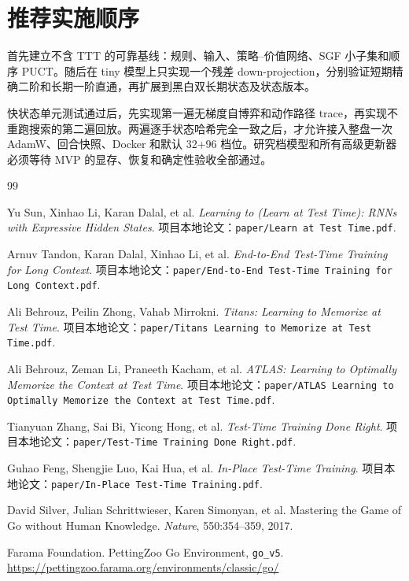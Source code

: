 \documentclass[UTF8,11pt,a4paper]{ctexart}
\newcommand{\code}[1]{\texttt{#1}}
\begin{document}
\section{推荐实施顺序}

首先建立不含 TTT 的可靠基线：规则、输入、策略--价值网络、SGF 小子集和顺序 PUCT。随后在 tiny 模型上只实现一个残差 down-projection，分别验证短期精确二阶和长期一阶直通，再扩展到黑白双长期状态及状态版本。

快状态单元测试通过后，先实现第一遍无梯度自博弈和动作路径 trace，再实现不重跑搜索的第二遍回放。两遍逐手状态哈希完全一致之后，才允许接入整盘一次 AdamW、回合快照、Docker 和默认 32+96 档位。研究档模型和所有高级更新器必须等待 MVP 的显存、恢复和确定性验收全部通过。

\begin{thebibliography}{99}
\small

Yu Sun, Xinhao Li, Karan Dalal, et al.
\newblock \emph{Learning to (Learn at Test Time): RNNs with Expressive Hidden States}.
\newblock 项目本地论文：\code{paper/Learn at Test Time.pdf}.

Arnuv Tandon, Karan Dalal, Xinhao Li, et al.
\newblock \emph{End-to-End Test-Time Training for Long Context}.
\newblock 项目本地论文：\code{paper/End-to-End Test-Time Training for Long Context.pdf}.

Ali Behrouz, Peilin Zhong, Vahab Mirrokni.
\newblock \emph{Titans: Learning to Memorize at Test Time}.
\newblock 项目本地论文：\code{paper/Titans Learning to Memorize at Test Time.pdf}.

Ali Behrouz, Zeman Li, Praneeth Kacham, et al.
\newblock \emph{ATLAS: Learning to Optimally Memorize the Context at Test Time}.
\newblock 项目本地论文：\code{paper/ATLAS Learning to Optimally Memorize the Context at Test Time.pdf}.

Tianyuan Zhang, Sai Bi, Yicong Hong, et al.
\newblock \emph{Test-Time Training Done Right}.
\newblock 项目本地论文：\code{paper/Test-Time Training Done Right.pdf}.

Guhao Feng, Shengjie Luo, Kai Hua, et al.
\newblock \emph{In-Place Test-Time Training}.
\newblock 项目本地论文：\code{paper/In-Place Test-Time Training.pdf}.

David Silver, Julian Schrittwieser, Karen Simonyan, et al.
\newblock Mastering the Game of Go without Human Knowledge.
\newblock \emph{Nature}, 550:354--359, 2017.

Farama Foundation.
\newblock PettingZoo Go Environment, \code{go\_v5}.
\newblock \url{https://pettingzoo.farama.org/environments/classic/go/}


\end{thebibliography}
\end{document}
